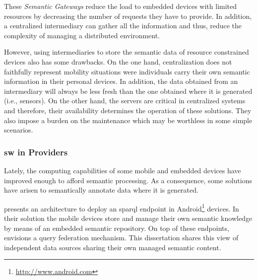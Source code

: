 These \emph{Semantic Gateways} reduce the load to embedded devices with limited resources by decreasing the number of requests they have to provide.
In addition, a centralized intermediary can gather all the information and thus, reduce the complexity of managing a distributed environment.

However, using intermediaries to store the semantic data of resource constrained devices also has some drawbacks.
On the one hand, centralization does not faithfully represent mobility situations were individuals carry their own semantic information in their personal devices.
In addition, the data obtained from an intermediary will always be less fresh than the one obtained where it is generated (i.e., sensors).
On the other hand, the servers are critical in centralized systems and therefore, their availability determines the operation of these solutions.
They also impose a burden on the maintenance which may be worthless in some simple scenarios.



\subsubsection{\acs{sw} in Providers}
\label{sec:sw_providers}

Lately, the computing capabilities of some mobile and embedded devices have improved enough to afford semantic processing. %
As a consequence, some solutions have arisen to semantically annotate data where it is generated. %


\citet{daquin_enabling_2011} presents an architecture to deploy an \acs{sparql} endpoint in Android\footnote{\url{http://www.android.com}} devices.
In their solution the mobile devices store and manage their own semantic knowledge by means of an embedded semantic repository.
On top of these endpoints, \citeauthor{daquin_enabling_2011} envisions a query federation mechanism.
This dissertation shares this view of independent data sources sharing their own managed semantic content. %


